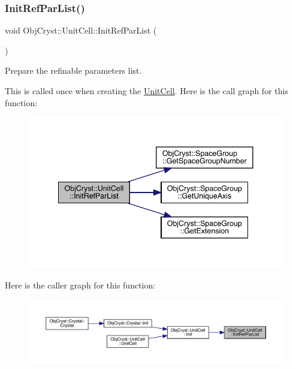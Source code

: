 \subsubsection{\texorpdfstring{InitRefParList()}{InitRefParList()}}
{\footnotesize\ttfamily void Obj\+Cryst\+::\+Unit\+Cell\+::\+Init\+Ref\+Par\+List (\begin{DoxyParamCaption}{ }\end{DoxyParamCaption})\hspace{0.3cm}{\ttfamily [protected]}}



Prepare the refinable parameters list. 

This is called once when creating the \mbox{\hyperlink{class_obj_cryst_1_1_unit_cell}{Unit\+Cell}}. Here is the call graph for this function\+:
\nopagebreak
\begin{figure}[H]
\begin{center}
\leavevmode
\includegraphics[width=341pt]{class_obj_cryst_1_1_unit_cell_a50170ade8b76500a86b99cd6caa06808_cgraph}
\end{center}
\end{figure}
Here is the caller graph for this function\+:
\nopagebreak
\begin{figure}[H]
\begin{center}
\leavevmode
\includegraphics[width=350pt]{class_obj_cryst_1_1_unit_cell_a50170ade8b76500a86b99cd6caa06808_icgraph}
\end{center}
\end{figure}
\mbox{\label{class_obj_cryst_1_1_unit_cell_a2c9490f42bf9fa2438eb311ac46fd448}} 
